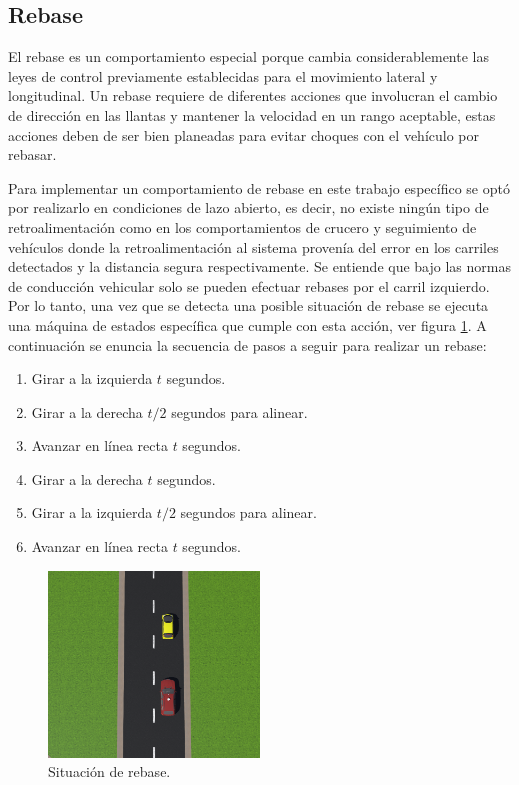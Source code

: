 \subsection{Rebase} \label{sub:rebase}

El rebase es un comportamiento especial porque cambia considerablemente las leyes de control previamente establecidas para el movimiento lateral y longitudinal. Un rebase requiere de diferentes acciones que involucran el cambio de dirección en las llantas y mantener la velocidad en un rango aceptable, estas acciones deben de ser bien planeadas para evitar choques con el vehículo por rebasar.

Para implementar un comportamiento de rebase en este trabajo específico se optó por realizarlo en condiciones de lazo abierto, es decir, no existe ningún tipo de retroalimentación como en los comportamientos de crucero y seguimiento de vehículos donde la retroalimentación al sistema provenía del error en los carriles detectados y la distancia segura respectivamente. Se entiende que bajo las normas de conducción vehicular solo se pueden efectuar rebases por el carril izquierdo. Por lo tanto, una vez que se detecta una posible situación de rebase se ejecuta una máquina de estados específica que cumple con esta acción, ver figura \ref{fig:pass}. A continuación se enuncia la secuencia de pasos a seguir para realizar un rebase:
\begin{enumerate}
    \item Girar a la izquierda $t$ segundos.
    \item Girar a la derecha $t/2$ segundos para alinear.
    \item Avanzar en línea recta $t$ segundos.
    \item Girar a la derecha $t$ segundos.
    \item Girar a la izquierda $t/2$ segundos para alinear.
    \item Avanzar en línea recta $t$ segundos.
\end{enumerate}
\begin{figure}[h]
    \centering
    \includegraphics[width=0.5\textwidth]{Figures/Figures_Cap06/rebase.png}
    \caption{Situación de rebase.}
    \label{fig:pass}
\end{figure}


